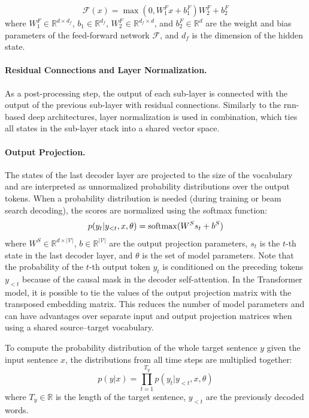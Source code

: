 \begin{equation}
  \mathcal{F}(x) = \max(0, W_1^Fx + b_1^F)W_2^F + b_2^F
\end{equation}
where $W_1^F \in \mathbb{R}^{d \times d_f}$, $b_1 \in \mathbb{R}^{d_f}$,
$W_2^F \in \mathbb{R}^{d_f \times d}$, and $b_2^F \in \mathbb{R}^d$ are the
weight and bias parameters of the feed-forward network $\mathcal{F}$, and $d_f$
is the dimension of the hidden state.

\paragraph{Residual Connections and Layer Normalization.} As a post-processing
step, the output of each sub-layer is connected with the output of the previous
sub-layer with residual connections. Similarly to the \acs{rnn}-based deep
architectures, layer normalization is used in combination, which ties all
states in the sub-layer stack into a shared vector space.

\paragraph{Output Projection.} The states of the last decoder layer are
projected to the size of the vocabulary and are interpreted as unnormalized
probability distributions over the output tokens. When a probability
distribution is needed (during training or beam search decoding), the scores
are normalized using the softmax function:
%
\begin{equation}
  p(y_t | y_{<t}, x, \theta) = \operatorname*{softmax}( W^S s_t + b^S )
\end{equation}
%
where $W^S \in \mathbb{R}^{d \times |\mathcal{V}|}$,
$b \in \mathbb{R}^{|\mathcal{V}|}$ are the output projection parameters, $s_t$
is the $t$-th state in the last decoder layer, and $\theta$ is the set of model
parameters. Note that the probability of the $t$-th output token $y_t$ is
conditioned on the preceding tokens $y_{<t}$ because of the causal mask in the
decoder self-attention. In the Transformer model, it is possible to tie the
values of the output projection matrix with the transposed embedding
matrix. This reduces the number of model parameters and can have advantages
over separate input and output projection matrices when using a shared
source--target vocabulary.

To compute the probability distribution of the whole target sentence $y$ given
the input sentence $x$, the distributions from all time steps are multiplied
together:
%
\begin{equation}
  p(y|x) = \prod_{t=1}^{T_y}p(y_t|y_{<t},x,\theta)
  \label{eq:output-distribution}
\end{equation}
%
where $T_y \in \mathbb{R}$ is the length of the target sentence, $y_{<t}$ are
the previously decoded words.


